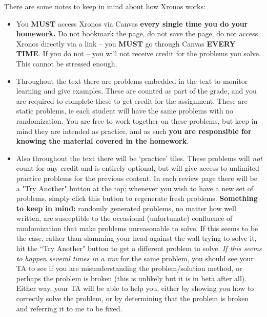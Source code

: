 \documentclass{ximera}
\begin{document}
    There are some notes to keep in mind about how Xronos works:
    \begin{itemize}
    	\item You \textbf{MUST} access Xronos via Canvas \textbf{every single time you do your homework.} Do not bookmark the page, do not save the page, do not access Xronos directly via a link -- you \textbf{MUST} go through Canvas \textbf{EVERY TIME}. If you do not -- you will not receive credit for the problems you solve. This cannot be stressed enough.
    	    
    	\item Throughout the text there are problems embedded in the text to monitor learning and give examples. These are counted as part of the grade, and you are required to complete these to get credit for the assignment. These are static problems, ie each student will have the same problems with no randomization. You are free to work together on these problems, but keep in mind they are intended as practice, and as such \textbf{you are responsible for knowing the material covered in the homework}. 
    	
    	\item Also throughout the text there will be `practice' tiles. These problems will \textit{not} count for any credit and is entirely optional, but will give access to unlimited practice problems for the previous content. In each review page there will be a "Try Another" button at the top; whenever you wish to have a new set of problems, simply click this button to regenerate fresh problems. \textbf{Something to keep in mind:} randomly generated problems, no matter how well written, are susceptible to the occasional (unfortunate) confluence of randomization that make problems unreasonable to solve. If this seems to be the case, rather than slamming your head against the wall trying to solve it, hit the ``Try Another" button to get a different problem to solve. \textit{If this seems to happen several times in a row} for the same problem, you should see your TA to see if you are misunderstanding the problem/solution method, or perhaps the problem is broken (this is unlikely but it is in beta after all). Either way, your TA will be able to help you, either by showing you how to correctly solve the problem, or by determining that the problem is broken and referring it to me to be fixed.
    \end{itemize}
\end{document}
